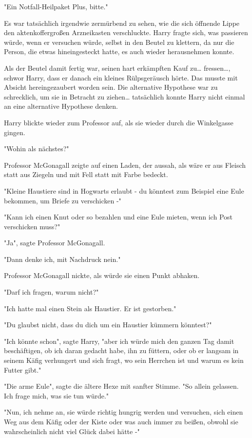 {"Ein Notfall-Heilpaket Plus, bitte."

Es war tatsächlich irgendwie zermürbend zu sehen, wie die sich öffnende Lippe den aktenkoffergroßen Arzneikasten verschluckte. Harry fragte sich, was passieren würde, wenn er versuchen würde, selbst in den Beutel zu klettern, da nur die Person, die etwas hineingesteckt hatte, es auch wieder herausnehmen konnte.

Als der Beutel damit fertig war, seinen hart erkämpften Kauf zu… fressen…, schwor Harry, dass er danach ein kleines Rülpsgeräusch hörte. Das musste mit Absicht hereingezaubert worden sein. Die alternative Hypothese war zu schrecklich, um sie in Betracht zu ziehen… tatsächlich konnte Harry nicht einmal an eine alternative Hypothese denken.

Harry blickte wieder zum Professor auf, als sie wieder durch die Winkelgasse gingen.

"Wohin als nächstes?"

Professor McGonagall zeigte auf einen Laden, der aussah, als wäre er aus Fleisch statt aus Ziegeln und mit Fell statt mit Farbe bedeckt.

"Kleine Haustiere sind in Hogwarts erlaubt - du könntest zum Beispiel eine Eule bekommen, um Briefe zu verschicken -"

"Kann ich einen Knut oder so bezahlen und eine Eule mieten, wenn ich Post verschicken muss?"

"Ja", sagte Professor McGonagall.

"Dann denke ich, mit Nachdruck nein."

Professor McGonagall nickte, als würde sie einen Punkt abhaken.

"Darf ich fragen, warum nicht?"

"Ich hatte mal einen Stein als Haustier. Er ist gestorben."

"Du glaubst nicht, dass du dich um ein Haustier kümmern könntest?"

"Ich könnte schon", sagte Harry, "aber ich würde mich den ganzen Tag damit beschäftigen, ob ich daran gedacht habe, ihn zu füttern, oder ob er langsam in seinem Käfig verhungert und sich fragt, wo sein Herrchen ist und warum es kein Futter gibt."

"Die arme Eule", sagte die ältere Hexe mit sanfter Stimme. "So allein gelassen. Ich frage mich, was sie tun würde."

"Nun, ich nehme an, sie würde richtig hungrig werden und versuchen, sich einen Weg aus dem Käfig oder der Kiste oder was auch immer zu beißen, obwohl sie wahrscheinlich nicht viel Glück dabei hätte -"

}
